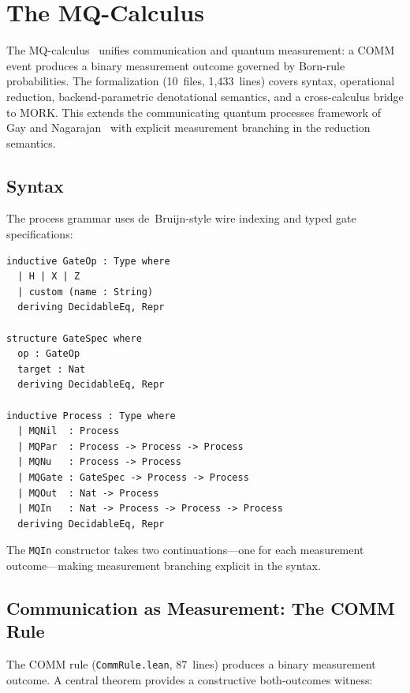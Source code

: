 \documentclass[11pt]{article}
\theoremstyle{definition}
\theoremstyle{remark}
\begin{document}
\section{The MQ-Calculus}
\label{sec:mq}

The MQ-calculus~\cite{StayMeredithMQ2026} unifies communication and
quantum measurement: a COMM event produces a binary measurement outcome
governed by Born-rule probabilities.  The formalization
(10~files, 1{,}433~lines) covers syntax, operational reduction,
backend-parametric denotational semantics, and a cross-calculus bridge
to MORK.
This extends the communicating quantum processes
framework of Gay and Nagarajan~\cite{GayNagarajan2005} with explicit
measurement branching in the reduction semantics.

\subsection{Syntax}

The process grammar uses de~Bruijn-style wire indexing and typed gate
specifications:

\begin{lstlisting}[caption={MQ-calculus process syntax (from \texttt{Syntax.lean})}]
inductive GateOp : Type where
  | H | X | Z
  | custom (name : String)
  deriving DecidableEq, Repr

structure GateSpec where
  op : GateOp
  target : Nat
  deriving DecidableEq, Repr

inductive Process : Type where
  | MQNil  : Process
  | MQPar  : Process -> Process -> Process
  | MQNu   : Process -> Process
  | MQGate : GateSpec -> Process -> Process
  | MQOut  : Nat -> Process
  | MQIn   : Nat -> Process -> Process -> Process
  deriving DecidableEq, Repr
\end{lstlisting}

\noindent
The \texttt{MQIn} constructor takes two continuations---one for each
measurement outcome---making measurement branching explicit in the
syntax.

\subsection{Communication as Measurement: The COMM Rule}

The COMM rule (\texttt{CommRule.lean}, 87~lines) produces a binary
measurement outcome.  A central theorem provides a constructive
both-outcomes witness:
\end{document}
